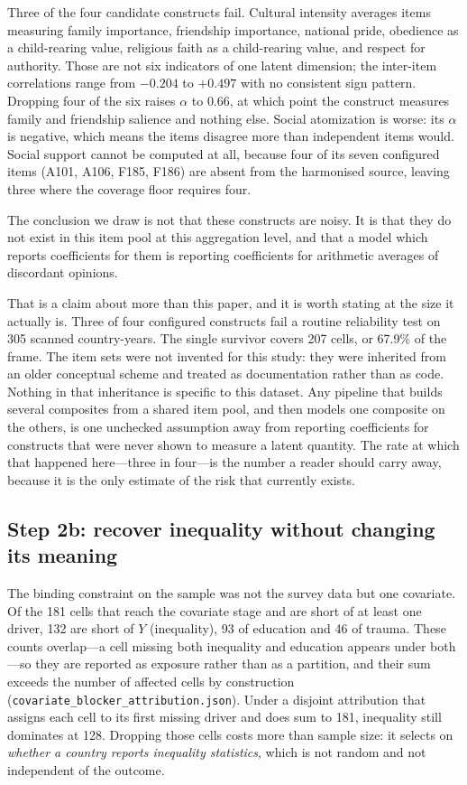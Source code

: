 \documentclass[11pt]{article}
\begin{document}
Three of the four candidate constructs fail. Cultural intensity averages items measuring family importance, friendship importance, national pride, obedience as a child-rearing value, religious faith as a child-rearing value, and respect for authority. Those are not six indicators of one latent dimension; the inter-item correlations range from $-0.204$ to $+0.497$ with no consistent sign pattern. Dropping four of the six raises $\alpha$ to $0.66$, at which point the construct measures family and friendship salience and nothing else. Social atomization is worse: its $\alpha$ is negative, which means the items disagree more than independent items would. Social support cannot be computed at all, because four of its seven configured items (A101, A106, F185, F186) are absent from the harmonised source, leaving three where the coverage floor requires four.

The conclusion we draw is not that these constructs are noisy. It is that they do not exist in this item pool at this aggregation level, and that a model which reports coefficients for them is reporting coefficients for arithmetic averages of discordant opinions.

That is a claim about more than this paper, and it is worth stating at the size it actually is. Three of four configured constructs fail a routine reliability test on \num{305} scanned country-years. The single survivor covers \num{207} cells, or \num{67.9}\% of the frame. The item sets were not invented for this study: they were inherited from an older conceptual scheme and treated as documentation rather than as code. Nothing in that inheritance is specific to this dataset. Any pipeline that builds several composites from a shared item pool, and then models one composite on the others, is one unchecked assumption away from reporting coefficients for constructs that were never shown to measure a latent quantity. The rate at which that happened here---three in four---is the number a reader should carry away, because it is the only estimate of the risk that currently exists.

\subsection*{Step 2b: recover inequality without changing its meaning}\label{sec:gini-backfill}

The binding constraint on the sample was not the survey data but one covariate.
Of the \num{181} cells that reach the covariate stage and are short of at least
one driver, \num{132} are short of $Y$ (inequality), \num{93} of education and
\num{46} of trauma. These counts overlap---a cell missing both inequality and
education appears under both---so they are reported as exposure rather than as
a partition, and their sum exceeds the number of affected cells by construction
(\texttt{covariate\_blocker\_attribution.json}). Under a disjoint attribution
that assigns each cell to its first missing driver and does sum to \num{181},
inequality still dominates at \num{128}. Dropping
those cells costs more than sample size: it selects on \emph{whether a country
reports inequality statistics}, which is not random and not independent of the
outcome.
\end{document}
